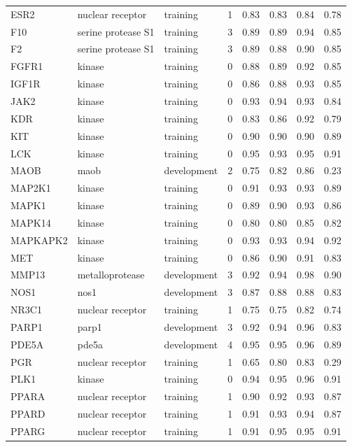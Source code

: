 \begin{longtable}{llllrrrr}
ESR2 & nuclear receptor & training & 1 & 0.83 & 0.83 & 0.84 & 0.78 \\
F10 & serine protease S1 & training & 3 & 0.89 & 0.89 & 0.94 & 0.85 \\
F2 & serine protease S1 & training & 3 & 0.89 & 0.88 & 0.90 & 0.85 \\
FGFR1 & kinase & training & 0 & 0.88 & 0.89 & 0.92 & 0.85 \\
IGF1R & kinase & training & 0 & 0.86 & 0.88 & 0.93 & 0.85 \\
JAK2 & kinase & training & 0 & 0.93 & 0.94 & 0.93 & 0.84 \\
KDR & kinase & training & 0 & 0.83 & 0.86 & 0.92 & 0.79 \\
KIT & kinase & training & 0 & 0.90 & 0.90 & 0.90 & 0.89 \\
LCK & kinase & training & 0 & 0.95 & 0.93 & 0.95 & 0.91 \\
MAOB & maob & development & 2 & 0.75 & 0.82 & 0.86 & 0.23 \\
MAP2K1 & kinase & training & 0 & 0.91 & 0.93 & 0.93 & 0.89 \\
MAPK1 & kinase & training & 0 & 0.89 & 0.90 & 0.93 & 0.86 \\
MAPK14 & kinase & training & 0 & 0.80 & 0.80 & 0.85 & 0.82 \\
MAPKAPK2 & kinase & training & 0 & 0.93 & 0.93 & 0.94 & 0.92 \\
MET & kinase & training & 0 & 0.86 & 0.90 & 0.91 & 0.83 \\
MMP13 & metalloprotease & development & 3 & 0.92 & 0.94 & 0.98 & 0.90 \\
NOS1 & nos1 & development & 3 & 0.87 & 0.88 & 0.88 & 0.83 \\
NR3C1 & nuclear receptor & training & 1 & 0.75 & 0.75 & 0.82 & 0.74 \\
PARP1 & parp1 & development & 3 & 0.92 & 0.94 & 0.96 & 0.83 \\
PDE5A & pde5a & development & 4 & 0.95 & 0.95 & 0.96 & 0.89 \\
PGR & nuclear receptor & training & 1 & 0.65 & 0.80 & 0.83 & 0.29 \\
PLK1 & kinase & training & 0 & 0.94 & 0.95 & 0.96 & 0.91 \\
PPARA & nuclear receptor & training & 1 & 0.90 & 0.92 & 0.93 & 0.87 \\
PPARD & nuclear receptor & training & 1 & 0.91 & 0.93 & 0.94 & 0.87 \\
PPARG & nuclear receptor & training & 1 & 0.91 & 0.95 & 0.95 & 0.91 \\

\end{longtable}

